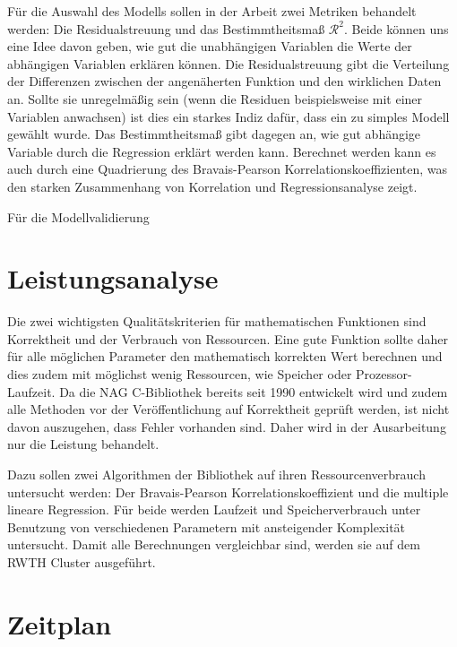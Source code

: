 \documentclass{article}
\begin{document}
Für die Auswahl des Modells sollen in der Arbeit zwei Metriken behandelt werden: Die Residualstreuung und das Bestimmtheitsmaß $\mathcal{R}^2$.
Beide können uns eine Idee davon geben, wie gut die unabhängigen Variablen die Werte der abhängigen Variablen erklären können.
Die Residualstreuung gibt die Verteilung der Differenzen zwischen der angenäherten Funktion und den wirklichen Daten an.
Sollte sie unregelmäßig sein (wenn die Residuen beispielsweise mit einer Variablen anwachsen) ist dies ein starkes Indiz dafür, dass ein zu simples Modell gewählt wurde. 
Das Bestimmtheitsmaß gibt dagegen an, wie gut abhängige Variable durch die Regression erklärt werden kann.
Berechnet werden kann es auch durch eine Quadrierung des Bravais-Pearson Korrelationskoeffizienten, was den starken Zusammenhang von Korrelation und Regressionsanalyse zeigt.

Für die Modellvalidierung 


\section{Leistungsanalyse}

Die zwei wichtigsten Qualitätskriterien für mathematischen Funktionen sind Korrektheit und der Verbrauch von Ressourcen.
Eine gute Funktion sollte daher für alle möglichen Parameter den mathematisch korrekten Wert berechnen und dies zudem mit möglichst wenig Ressourcen, wie Speicher oder Prozessor-Laufzeit.
Da die NAG C-Bibliothek bereits seit 1990 entwickelt wird\cite{Wikipedia:nag} und zudem alle Methoden vor der Veröffentlichung auf Korrektheit geprüft werden\cite{NAG2011}, ist nicht davon auszugehen, dass Fehler vorhanden sind.
Daher wird in der Ausarbeitung nur die Leistung behandelt.

Dazu sollen zwei Algorithmen der Bibliothek auf ihren Ressourcenverbrauch untersucht werden: Der Bravais-Pearson Korrelationskoeffizient und die multiple lineare Regression.
Für beide werden Laufzeit und Speicherverbrauch unter Benutzung von verschiedenen Parametern mit ansteigender Komplexität untersucht.
Damit alle Berechnungen vergleichbar sind, werden sie auf dem RWTH Cluster ausgeführt.

\section{Zeitplan}
\end{document}
